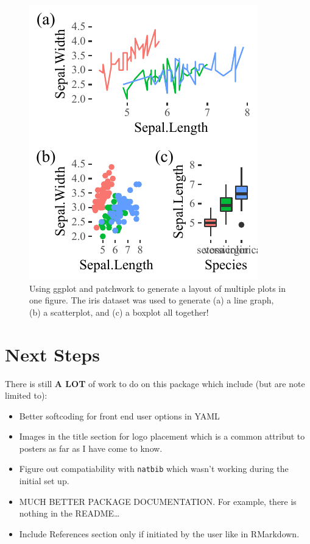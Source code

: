 \documentclass[article,6pt,extrafontsizes]{memoir}
\begin{document}
\begin{adjmulticols*}{3}{0.1cm}{0.1cm}
{\begin{figure}

{\centering \includegraphics[width=0.8\linewidth]{OtagoPosterPortrait_files/figure-latex/unnamed-chunk-4-1} 

}

\caption{Using ggplot and patchwork to generate a layout of multiple plots in one figure. The iris dataset was used to generate (a) a line graph, (b) a scatterplot, and (c) a boxplot all together!}\label{fig:unnamed-chunk-4}
\end{figure}

\lipsum[1]

\section{Next Steps}\label{next-steps}

There is still \textbf{A LOT} of work to do on this package which
include (but are note limited to):

\begin{itemize}
\tightlist
\item
  Better softcoding for front end user options in YAML
\item
  Images in the title section for logo placement which is a common
  attribut to posters as far as I have come to know.
\item
  Figure out compatiability with \texttt{natbib} which wasn't working
  during the initial set up.
\item
  MUCH BETTER PACKAGE DOCUMENTATION. For example, there is nothing in
  the README\ldots{}
\item
  Include References section only if initiated by the user like in
  RMarkdown.
\end{itemize}

\small\printbibliography
}
\end{adjmulticols*}
\end{document}

